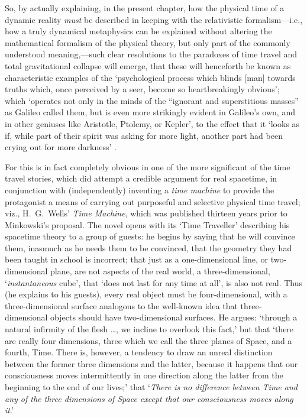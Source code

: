 So, by actually explaining, in the present chapter, how the physical time of a dynamic reality \textit{must} be described in keeping with the relativistic formalism---i.e., how a truly dynamical metaphysics can be explained without altering the mathematical formalism of the physical theory, but only part of the commonly understood meaning,---such clear resolutions to the paradoxes of time travel and total gravitational collapse will emerge, that these will henceforth be known as characteristic examples of the `psychological process which blinds [man] towards truths which, once perceived by a seer, become so heartbreakingly obvious'; which `operates not only in the minds of the ``ignorant and superstitious masses'' as Galileo called them, but is even more strikingly evident in Galileo's own, and in other geniuses like Aristotle, Ptolemy, or Kepler', to the effect that it `looks as if, while part of their spirit was asking for more light, another part had been crying out for more darkness' \cite{Koestler1959}.

For this is in fact completely obvious in one of the more significant of the time travel stories, which did attempt a credible argument for real spacetime, in conjunction with (independently) inventing a \textit{time machine} to provide the protagonist a means of carrying out purposeful and selective physical time travel; viz., H.~G.~Wells' \textit{Time Machine}, which was published thirteen years prior to Minkowski's proposal. The novel \cite{Wells1931} opens with its `Time Traveller' describing his spacetime theory to a group of guests: he begins by saying that he will convince them, inasmuch as he needs them to be convinced, that the geometry they had been taught in school is incorrect; that just as a one-dimensional line, or two-dimensional plane, are not aspects of the real world, a three-dimensional, `\textit{instantaneous} cube', that `does not last for any time at all', is also not real. Thus (he explains to his guests), every real object must be four-dimensional, with a three-dimensional surface analogous to the well-known idea that three-dimensional objects should have two-dimensional surfaces. He argues: `through a natural infirmity of the flesh \ldots, we incline to overlook this fact,' but that `there are really four dimensions, three which we call the three planes of Space, and a fourth, Time. There is, however, a tendency to draw an unreal distinction between the former three dimensions and the latter, because it happens that our consciousness moves intermittently in one direction along the latter from the beginning to the end of our lives;' that `\textit{There is no difference between Time and any of the three dimensions of Space except that our consciousness moves along it}.'

